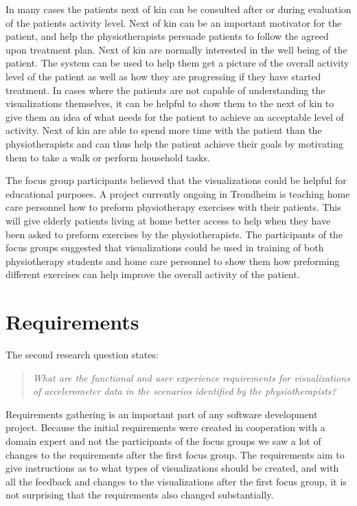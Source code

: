 In many cases the patients next of kin can be consulted after or during evaluation of the patients activity level. Next of kin can be an important motivator for the patient, and help the physiotherapists persuade patients to follow the agreed upon treatment plan. Next of kin are normally interested in the well being of the patient. The system can be used to help them get a picture of the overall activity level of the patient as well as how they are progressing if they have started treatment. In cases where the patients are not capable of understanding the visualizations themselves, it can be helpful to show them to the next of kin to give them an idea of what needs for the patient to achieve an acceptable level of activity. Next of kin are able to spend more time with the patient than the physiotherapists and can thus help the patient achieve their goals by motivating them to take a walk or perform household tasks.

The focus group participants believed that the visualizations could be helpful for educational purposes. A project currently ongoing in Trondheim is teaching home care personnel how to preform physiotherapy exercises with their patients. This will give elderly patients living at home better access to help when they have been asked to preform exercises by the physiotherapists. The participants of the focus groups suggested that visualizations could be used in training of both physiotherapy students and home care personnel to show them how preforming different exercises can help improve the overall activity of the patient.

\section{Requirements}
The second research question states:
\begin{quote}
\textit{What are the functional and user experience requirements for visualizations of accelerometer data in the scenarios identified by the physiotherapists?}
\end{quote}

Requirements gathering is an important part of any software development project. Because the initial requirements were created in cooperation with a domain expert and not the participants of the focus groups we saw a lot of changes to the requirements after the first focus group. The requirements aim to give instructions as to what types of visualizations should be created, and with all the feedback and changes to the visualizations after the first focus group, it is not surprising that the requirements also changed substantially.

